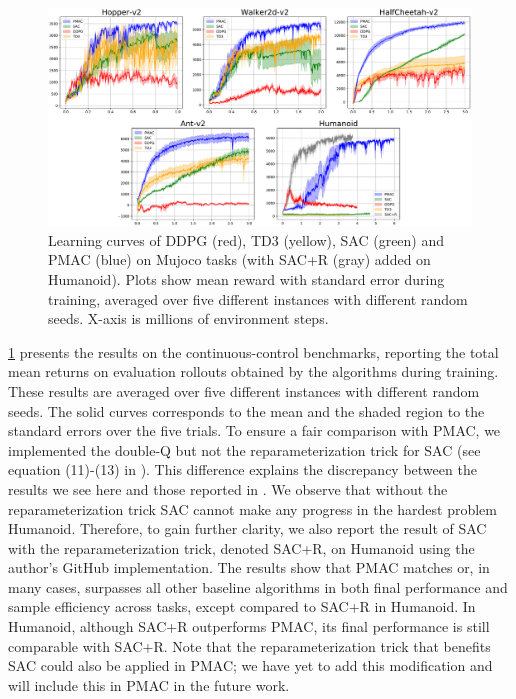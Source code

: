 \begin{figure}[t]
\begin{center}
\includegraphics[width=0.8\linewidth]{./mujoco-results.pdf}
\end{center}
\caption{
Learning curves of DDPG (red), TD3 (yellow), SAC (green) and PMAC (blue) on
Mujoco tasks (with SAC+R (gray) added on Humanoid).
Plots show mean reward with standard error during training,
averaged over five different instances with different random seeds.
X-axis is millions of environment steps.
}
\label{fig:result-mujoco} 
\end{figure}

\cref{fig:result-mujoco} presents the results on the 
continuous-control benchmarks, reporting the total mean returns
on evaluation rollouts obtained by the algorithms during training.
These
results are averaged over five different instances
with different random seeds.
The solid curves corresponds to the mean and the shaded region to the
standard errors over the five trials.
To ensure a fair comparison with PMAC, we implemented the double-Q
but not the reparameterization trick for SAC 
(see equation (11)-(13) in \citep{haarnoja2018soft}).
This difference explains the discrepancy between the results we see here
and those reported in \citep{haarnoja2018soft}.
We observe that without the reparameterization trick SAC cannot make
any progress in the hardest problem Humanoid.
Therefore, to gain further clarity, 
we also report the result of SAC with the reparameterization trick,
denoted SAC+R,
on Humanoid using the author's GitHub implementation.
The results show that PMAC matches or, in many cases, surpasses all other
baseline algorithms in both final performance and sample efficiency across
tasks, except compared to SAC+R in Humanoid.
In Humanoid, although SAC+R outperforms PMAC,
its final performance is still comparable with SAC+R.
Note that the reparameterization trick that benefits SAC
could also be applied in PMAC;
we have yet to add this modification and
will include this in PMAC in the future work.


